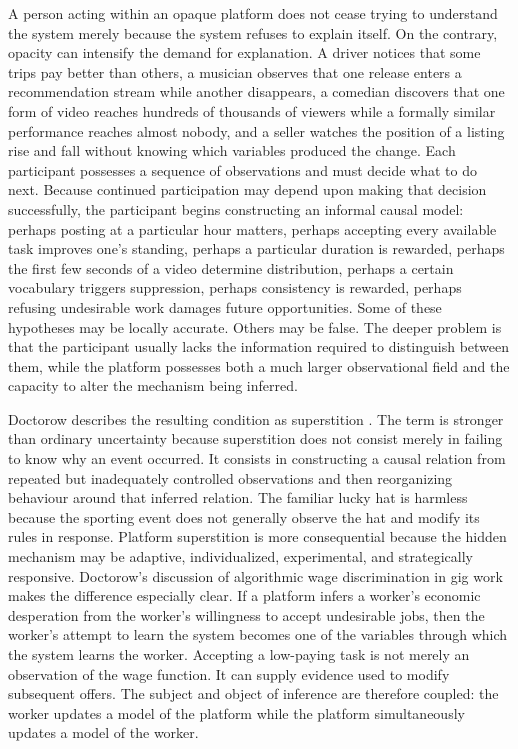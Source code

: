 \documentclass[11pt]{article}
\begin{document}
A person acting within an opaque platform does not cease trying to understand the system merely because the system refuses to explain itself. On the contrary, opacity can intensify the demand for explanation. A driver notices that some trips pay better than others, a musician observes that one release enters a recommendation stream while another disappears, a comedian discovers that one form of video reaches hundreds of thousands of viewers while a formally similar performance reaches almost nobody, and a seller watches the position of a listing rise and fall without knowing which variables produced the change. Each participant possesses a sequence of observations and must decide what to do next. Because continued participation may depend upon making that decision successfully, the participant begins constructing an informal causal model: perhaps posting at a particular hour matters, perhaps accepting every available task improves one's standing, perhaps a particular duration is rewarded, perhaps the first few seconds of a video determine distribution, perhaps a certain vocabulary triggers suppression, perhaps consistency is rewarded, perhaps refusing undesirable work damages future opportunities. Some of these hypotheses may be locally accurate. Others may be false. The deeper problem is that the participant usually lacks the information required to distinguish between them, while the platform possesses both a much larger observational field and the capacity to alter the mechanism being inferred.

Doctorow describes the resulting condition as superstition \parencite{doctorowfox2026}. The term is stronger than ordinary uncertainty because superstition does not consist merely in failing to know why an event occurred. It consists in constructing a causal relation from repeated but inadequately controlled observations and then reorganizing behaviour around that inferred relation. The familiar lucky hat is harmless because the sporting event does not generally observe the hat and modify its rules in response. Platform superstition is more consequential because the hidden mechanism may be adaptive, individualized, experimental, and strategically responsive. Doctorow's discussion of algorithmic wage discrimination in gig work \parencite{dubal2023algorithmic,calo2015digitalmarket} makes the difference especially clear. If a platform infers a worker's economic desperation from the worker's willingness to accept undesirable jobs, then the worker's attempt to learn the system becomes one of the variables through which the system learns the worker. Accepting a low-paying task is not merely an observation of the wage function. It can supply evidence used to modify subsequent offers. The subject and object of inference are therefore coupled: the worker updates a model of the platform while the platform simultaneously updates a model of the worker.
\end{document}

